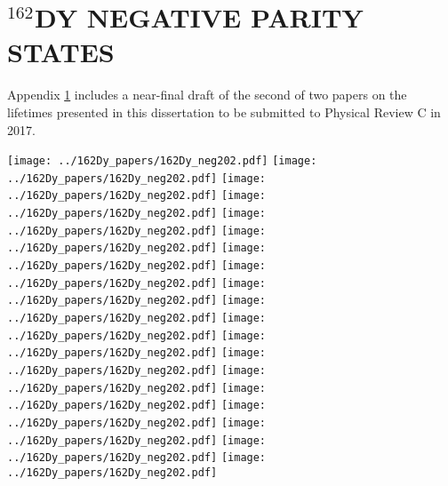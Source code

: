 \chapter{$^{162}$DY NEGATIVE PARITY STATES}\label{appendix:162Dy_neg}


Appendix \ref{appendix:162Dy_neg} includes a near-final draft of the second of two papers on the lifetimes presented in this dissertation to be submitted to Physical Review C in 2017.

\newpage

\texttt{[image: ../162Dy\_papers/162Dy\_neg202.pdf]}\newpage
\texttt{[image: ../162Dy\_papers/162Dy\_neg202.pdf]}\newpage
\texttt{[image: ../162Dy\_papers/162Dy\_neg202.pdf]}\newpage
\texttt{[image: ../162Dy\_papers/162Dy\_neg202.pdf]}\newpage
\texttt{[image: ../162Dy\_papers/162Dy\_neg202.pdf]}\newpage
\texttt{[image: ../162Dy\_papers/162Dy\_neg202.pdf]}\newpage
\texttt{[image: ../162Dy\_papers/162Dy\_neg202.pdf]}\newpage
\texttt{[image: ../162Dy\_papers/162Dy\_neg202.pdf]}\newpage
\texttt{[image: ../162Dy\_papers/162Dy\_neg202.pdf]}\newpage
\texttt{[image: ../162Dy\_papers/162Dy\_neg202.pdf]}\newpage
\texttt{[image: ../162Dy\_papers/162Dy\_neg202.pdf]}\newpage
\texttt{[image: ../162Dy\_papers/162Dy\_neg202.pdf]}\newpage
\texttt{[image: ../162Dy\_papers/162Dy\_neg202.pdf]}\newpage
\texttt{[image: ../162Dy\_papers/162Dy\_neg202.pdf]}\newpage
\texttt{[image: ../162Dy\_papers/162Dy\_neg202.pdf]}\newpage
\texttt{[image: ../162Dy\_papers/162Dy\_neg202.pdf]}\newpage
\texttt{[image: ../162Dy\_papers/162Dy\_neg202.pdf]}\newpage
\texttt{[image: ../162Dy\_papers/162Dy\_neg202.pdf]}\newpage
\texttt{[image: ../162Dy\_papers/162Dy\_neg202.pdf]}

